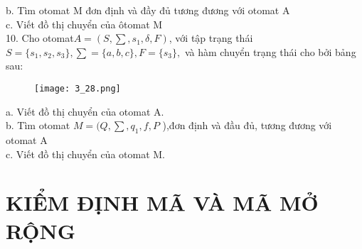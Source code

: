 \begin{flushleft}
\hspace{10mm} b. Tìm otomat M đơn định và đầy đủ tương đương với otomat A\\
\hspace{10mm} c. Viết đồ thị chuyển của ôtomat M\\
10. Cho otomat$ A = (S, \sum , s_1, \delta, F)$, với tập trạng thái $S = \{s_1, s_2, s_3\}, \sum = \{ a, b, c\}, F = \{s_3\},$
và hàm chuyển trạng thái cho bởi bảng sau:\\
\begin{figure}[ht]
\texttt{[image: 3\_28.png]}
\end{figure}
\hspace{10mm} a. Viết đồ thị chuyển của otomat A.\\
\hspace{10mm} b. Tìm otomat $M = (Q, \sum , q_1, f, P$ ),đơn định và đầu đủ, tương đương với otomat A\\
\hspace{10mm} c. Viết đồ thị chuyển của otomat M.






\end{flushleft}






\chapter{KIỂM ĐỊNH MÃ VÀ MÃ MỞ RỘNG}

